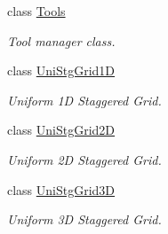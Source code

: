 \begin{DoxyCompactItemize}
class \hyperlink{classmtk_1_1Tools}{Tools}
\begin{DoxyCompactList}\small\item\em Tool manager class. \end{DoxyCompactList}\item 
class \hyperlink{classmtk_1_1UniStgGrid1D}{Uni\+Stg\+Grid1\+D}
\begin{DoxyCompactList}\small\item\em Uniform 1\+D Staggered Grid. \end{DoxyCompactList}\item 
class \hyperlink{classmtk_1_1UniStgGrid2D}{Uni\+Stg\+Grid2\+D}
\begin{DoxyCompactList}\small\item\em Uniform 2\+D Staggered Grid. \end{DoxyCompactList}\item 
class \hyperlink{classmtk_1_1UniStgGrid3D}{Uni\+Stg\+Grid3\+D}
\begin{DoxyCompactList}\small\item\em Uniform 3\+D Staggered Grid. \end{DoxyCompactList}\end{DoxyCompactItemize}
